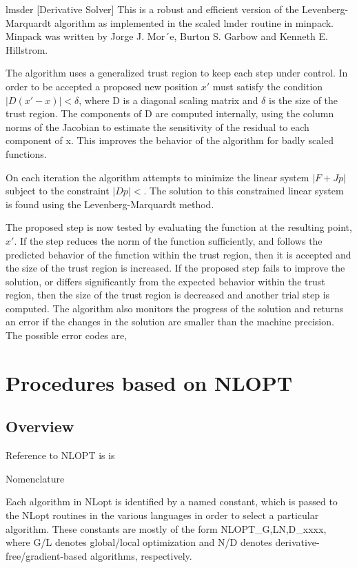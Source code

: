 lmsder [Derivative Solver]
This is a robust and efficient version of the Levenberg-Marquardt algorithm as implemented
in the scaled lmder routine in minpack. Minpack was written by Jorge
J. Mor´e, Burton S. Garbow and Kenneth E. Hillstrom.


The algorithm uses a generalized trust region to keep each step under control. In order
to be accepted a proposed new position $x′$ must satisfy the condition $|D(x′ −x)| < \delta$,
where D is a diagonal scaling matrix and $\delta$ is the size of the trust region. The
components of D are computed internally, using the column norms of the Jacobian
to estimate the sensitivity of the residual to each component of x. This improves the
behavior of the algorithm for badly scaled functions.


On each iteration the algorithm attempts to minimize the linear system $|F + Jp|$ subject to the constraint $|Dp| < $. The solution to this constrained linear system is found using the Levenberg-Marquardt method.

The proposed step is now tested by evaluating the function at the resulting point,
$x′$. If the step reduces the norm of the function sufficiently, and follows the predicted
behavior of the function within the trust region, then it is accepted and the size of
the trust region is increased. If the proposed step fails to improve the solution, or
differs significantly from the expected behavior within the trust region, then the size
of the trust region is decreased and another trial step is computed.
The algorithm also monitors the progress of the solution and returns an error if the
changes in the solution are smaller than the machine precision. The possible error
codes are,







\chapter{Procedures based on NLOPT}
\label{NonlinearOptimization} 

\section{Overview}

Reference to NLOPT is  is \cite{Johnson2012}


Nomenclature

Each algorithm in NLopt is identified by a named constant, which is passed to the NLopt routines in the various languages in order to select a particular algorithm. These constants are mostly of the form NLOPT\_{G,L}{N,D}\_xxxx, where G/L denotes global/local optimization and N/D denotes derivative-free/gradient-based algorithms, respectively. 

